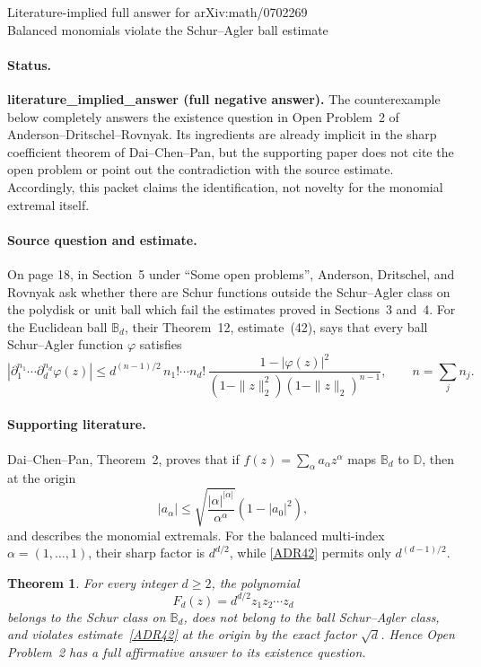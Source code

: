 \documentclass[11pt]{article}
\newtheorem*{theorem}{Theorem}
\newcommand{\D}{\mathbb D}
\newcommand{\B}{\mathbb B}
\begin{document}
\begin{center}
{\Large Literature-implied full answer for arXiv:math/0702269}\\[4pt]
{\large Balanced monomials violate the Schur--Agler ball estimate}
\end{center}

\paragraph{Status.}
\textbf{literature\_implied\_answer (full negative answer).}
The counterexample below completely answers the existence question in Open
Problem~2 of Anderson--Dritschel--Rovnyak.  Its ingredients are already implicit
in the sharp coefficient theorem of Dai--Chen--Pan, but the supporting paper
does not cite the open problem or point out the contradiction with the source
estimate.  Accordingly, this packet claims the identification, not novelty for
the monomial extremal itself.

\paragraph{Source question and estimate.}
On page 18, in Section~5 under ``Some open problems'', Anderson, Dritschel, and
Rovnyak ask whether there are Schur functions outside the Schur--Agler class on
the polydisk or unit ball which fail the estimates proved in Sections~3 and~4.
For the Euclidean ball $\B_d$, their Theorem~12, estimate~(42), says that every
ball Schur--Agler function $\varphi$ satisfies
\begin{equation}\label{ADR42}
 \left|\partial_1^{n_1}\cdots\partial_d^{n_d}\varphi(z)\right|
 \le d^{(n-1)/2}\,n_1!\cdots n_d!\,
 \frac{1-|\varphi(z)|^2}
 {(1-\|z\|_2^2)(1-\|z\|_2)^{n-1}},
 \qquad n=\sum_j n_j.
\end{equation}

\paragraph{Supporting literature.}
Dai--Chen--Pan, Theorem~2, proves that if
$f(z)=\sum_\alpha a_\alpha z^\alpha$ maps $\B_d$ to $\D$, then at the origin
\[
 |a_\alpha|\le
 \sqrt{\frac{|\alpha|^{|\alpha|}}{\alpha^\alpha}}
 (1-|a_0|^2),
\]
and describes the monomial extremals.  For the balanced multi-index
$\alpha=(1,\ldots,1)$, their sharp factor is $d^{d/2}$, while
\eqref{ADR42} permits only $d^{(d-1)/2}$.

\begin{theorem}
For every integer $d\ge2$, the polynomial
\[
 F_d(z)=d^{d/2}z_1z_2\cdots z_d
\]
belongs to the Schur class on $\B_d$, does not belong to the ball
Schur--Agler class, and violates estimate~\eqref{ADR42} at the origin by the
exact factor $\sqrt d$.  Hence Open Problem~2 has a full affirmative answer to
its existence question.
\end{theorem}
\end{document}
